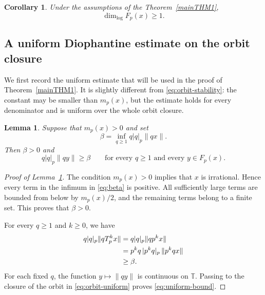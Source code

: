 \documentclass[11pt]{article}
\newtheorem{lemma}[theorem]{Lemma}
\newtheorem{corollary}[theorem]{Corollary}
\theoremstyle{remark}
\newcommand{\T}{\mathbb{T}}
\newcommand{\Fp}{F_p}
\newcommand{\mpc}{m_p}
\begin{document}
\begin{corollary}\label{cor_dimlog_bound}
Under the assumptions of the Theorem~\ref{mainTHM1},
\begin{equation} \label{eq:log-dimension-bound}
    \dim_{\log}\Fp(x)\geq1.
\end{equation}
\end{corollary}

\subsection{A uniform Diophantine estimate on the orbit closure}\label{s3}

We first record the uniform estimate that will be used in the proof
of Theorem~\ref{mainTHM1}.  It is slightly different from
\eqref{eq:orbit-stability}: the constant may be smaller than
$\mpc(x)$, but the estimate holds for every denominator and is
uniform over the whole orbit closure.

\begin{lemma}\label{lemma_for_orbit_closure}
Suppose that $\mpc(x)>0$ and set
\begin{equation}  \label{eq:beta}
    \beta=\inf_{q\geq1}q|q|_p\|qx\|.
\end{equation}
Then $\beta>0$ and
\begin{equation}  \label{eq:uniform-bound}
    q|q|_p\|qy\|\geq\beta
    \qquad\text{for every $q\geq1$ and every $y\in\Fp(x)$.}
\end{equation}
\end{lemma}

\begin{proof}[Proof of Lemma~\ref{lemma_for_orbit_closure}]
The condition $\mpc(x)>0$ implies that $x$ is irrational.  Hence
every term in the infimum in \eqref{eq:beta} is positive.  All
sufficiently large terms are bounded from below by $\mpc(x)/2$, and
the remaining terms belong to a finite set. This proves that
$\beta>0$.

For every $q\geq1$ and $k\geq0$, we have
\begin{align} \label{eq:orbit-uniform}
    q|q|_p\|qT_p^k x\|
    &=q|q|_p\|qp^k x\| \notag\\
    &=p^kq\,|p^kq|_p\,\|p^kqx\| \notag\\
    &\geq\beta.
\end{align}
For each fixed $q$, the function $y\mapsto\|qy\|$ is continuous on
$\T$. Passing to the closure of the orbit in
\eqref{eq:orbit-uniform} proves \eqref{eq:uniform-bound}.
\end{proof}
\end{document}
